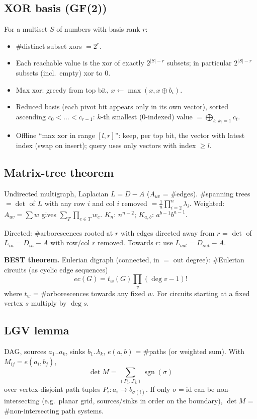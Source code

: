 \subsection{XOR basis (GF(2))}
For a multiset $S$ of numbers with basis rank $r$:
\begin{itemize}
\item \#distinct subset xors $=2^r$.
\item Each reachable value is the xor of exactly $2^{|S|-r}$ subsets;
in particular $2^{|S|-r}$ subsets (incl.\ empty) xor to $0$.
\item Max xor: greedy from top bit, $x\gets\max(x,x\oplus b_i)$.
\item Reduced basis (each pivot bit appears only in its own vector),
sorted ascending $c_0<\dots<c_{r-1}$: $k$-th smallest ($0$-indexed)
value $=\bigoplus_{t:\,k_t=1}c_t$.
\item Offline ``max xor in range $[l,r]$'': keep, per top bit,
the vector with latest index (swap on insert); query uses only
vectors with index $\ge l$.
\end{itemize}

\subsection{Matrix-tree theorem}
Undirected multigraph, Laplacian $L=D-A$ ($A_{uv}$ = \#edges).
\#spanning trees $=\det$ of $L$ with any row $i$ and col $i$
removed $=\frac1n\prod_{i=2}^n\lambda_i$. Weighted: $A_{uv}=\sum w$
gives $\sum_T\prod_{e\in T}w_e$. $K_n$: $n^{n-2}$; $K_{a,b}$: $a^{b-1}b^{a-1}$.

Directed: \#arborescences rooted at $r$ with edges directed away
from $r$ = $\det$ of $L_{in}=D_{in}-A$ with row/col $r$ removed.
Towards $r$: use $L_{out}=D_{out}-A$.

\textbf{BEST theorem.} Eulerian digraph (connected, in $=$ out degree):
\#Eulerian circuits (as cyclic edge sequences)
\[ec(G)=t_w(G)\prod_v(\deg v-1)!\]
where $t_w$ = \#arborescences towards any fixed $w$.
For circuits starting at a fixed vertex $s$ multiply by $\deg s$.

\subsection{LGV lemma}
DAG, sources $a_1..a_k$, sinks $b_1..b_k$, $e(a,b)$ = \#paths
(or weighted sum). With $M_{ij}=e(a_i,b_j)$,
\[\det M=\sum_{(P_1..P_k)}\operatorname{sgn}(\sigma)\]
over vertex-disjoint path tuples $P_i:a_i\to b_{\sigma(i)}$.
If only $\sigma=\mathrm{id}$ can be non-intersecting (e.g.\ planar
grid, sources/sinks in order on the boundary), $\det M$ = \#non-intersecting path systems.

